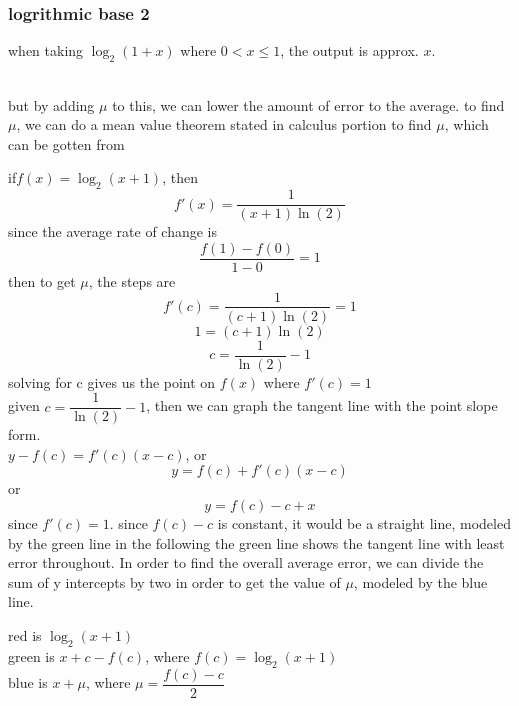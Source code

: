 \documentclass{article} %
\theoremstyle{theorem}
\theoremstyle{definition}
\begin{document}
        \subsubsection{logrithmic base 2}
        when taking $\log_2(1+x)$ where $0<x \leq1$, the output is approx. $x$.\\
        \\but by adding $\mu$ to this, we can lower the amount of error to the average.
        to find $\mu$, we can do a mean value theorem stated in calculus portion to find $\mu$, which can be gotten from
        \begin{center}
            if$f(x)=\log_2(x+1)$, then $$f'(x)=\dfrac{1}{(x+1)\ln(2)}$$since the average rate of change is $$\dfrac{f(1)-f(0)}{1-0}=1$$
            then to get $\mu$, the steps are $$f'(c)=\dfrac{1}{(c+1)\ln(2)}=1$$ $$1=(c+1)\ln(2)$$ $$c=\dfrac{1}{\ln(2)}-1$$
            solving for c gives us the point on $f(x)$ where $f'(c)=1$
            \\given $c=\dfrac{1}{\ln(2)}-1$, then we can graph the tangent line with the point slope form.\\ $y-f(c)=f'(c)(x-c)$, or
            $$y=f(c)+f'(c)(x-c)$$ or $$y=f(c)-c+x$$ since $f'(c)=1$. since $f(c)-c$ is constant, it would be a straight line, modeled by the green line in the following
            the green line shows the tangent line with least error throughout. In order to find the overall average error, we can divide the sum of y intercepts by two in order to get the value of $\mu$, modeled by the blue line.
            red is $\log_2(x+1)$\\
            green is $x+c-f(c)$, where $f(c)=\log_2(x+1)$\\
            blue is $x+\mu$, where $\mu=\dfrac{f(c)-c}{2}$
        \end{center}
\end{document}
